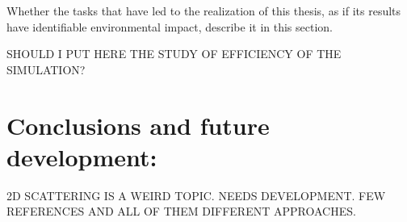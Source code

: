 \documentclass[a4paper,12pt]{article}
\begin{document}
{Whether the tasks that have led to the realization of this thesis, as if its results have identifiable environmental
impact, describe it in this section.}

SHOULD I PUT HERE THE STUDY OF EFFICIENCY OF THE SIMULATION?

\clearpage
\section{Conclusions and future development: }

2D SCATTERING IS A WEIRD TOPIC. NEEDS DEVELOPMENT. FEW REFERENCES AND ALL OF THEM DIFFERENT APPROACHES.

\newpage

\medskip



\clearpage
\newpage

\begin{appendices}





\end{appendices}
\end{document}
